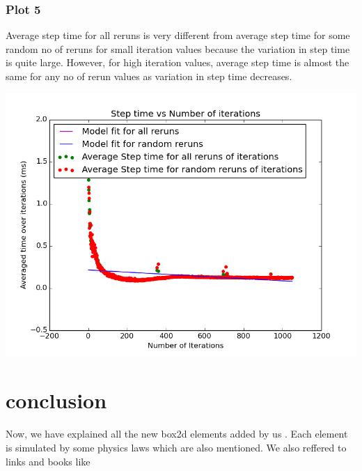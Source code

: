 \documentclass[11pt]{article}
\begin{document}
\subsubsection{Plot 5}
Average step time for all reruns is very different from average step time for some random no of reruns for small iteration values
because the variation in step time is quite large. However, for high iteration values, average step time is almost the same for any no of
rerun values as variation in step time decreases.\\
\begin{center}
\includegraphics[scale=0.5]{../plots/g21_plot05.png}
\end{center}

\section{conclusion}
Now, we have explained all the new box2d elements added by us . Each element is simulated by some physics laws which are also mentioned.
We also reffered to links\cite{cs296_21:1} \cite{cs296_21:2} \cite{cs296_21:3} and books like \cite{book1}


\end{document}
